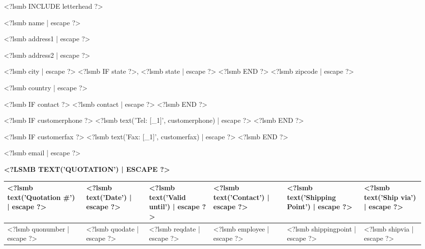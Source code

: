 \documentclass{scrartcl}
\begin{document}
\pagestyle{myheadings}
\thispagestyle{empty}

\fontsize{10pt}{12pt}\selectfont

\newsavebox{\ftr}

<?lsmb INCLUDE letterhead ?>



\vspace*{0.5cm}

\parbox[t]{.5\textwidth}{

<?lsmb name | escape ?>

<?lsmb address1 | escape ?>

<?lsmb address2 | escape ?>

<?lsmb city | escape ?>
<?lsmb IF state ?>\hspace{-0.1cm}, <?lsmb state | escape ?>
<?lsmb END ?>
<?lsmb zipcode | escape ?>

<?lsmb country | escape ?>

\vspace{0.3cm}

<?lsmb IF contact ?>
<?lsmb contact | escape ?>
\vspace{0.2cm}
<?lsmb END ?>

<?lsmb IF customerphone ?>
<?lsmb text('Tel: [_1]', customerphone) | escape ?>
<?lsmb END ?>

<?lsmb IF customerfax ?>
<?lsmb text('Fax: [_1]', customerfax) | escape ?>
<?lsmb END ?>

<?lsmb email | escape ?>
}

\vspace{1cm}

\textbf{\MakeUppercase{<?lsmb text('Quotation') | escape ?>}}
\hfill

\vspace{1cm}

\begin{tabularx}{\textwidth}{*{6}{|X}|} \hline
  \textbf{<?lsmb text('Quotation #') | escape ?>} & \textbf{<?lsmb text('Date') | escape ?>}
  & \textbf{<?lsmb text('Valid until') | escape ?>} & \textbf{<?lsmb text('Contact') | escape ?>}
  & \textbf{<?lsmb text('Shipping Point') | escape ?>}
  & \textbf{<?lsmb text('Ship via') | escape ?>} \\ [0.5ex]
  \hline
  <?lsmb quonumber | escape ?> & <?lsmb quodate | escape ?> & <?lsmb reqdate | escape ?> & <?lsmb employee | escape ?> & <?lsmb shippingpoint | escape ?> & <?lsmb shipvia | escape ?> \\
  \hline
\end{tabularx}
\end{document}
